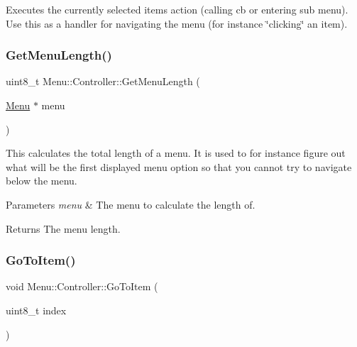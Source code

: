 Executes the currently selected items action (calling cb or entering sub menu). Use this as a handler for navigating the menu (for instance \char`\"{}clicking\char`\"{} an item). \hypertarget{class_menu_1_1_controller_a24009cee76b147079041b2130a806027}{}\label{class_menu_1_1_controller_a24009cee76b147079041b2130a806027} 
\subsubsection{\texorpdfstring{Get\+Menu\+Length()}{GetMenuLength()}}
{\footnotesize\ttfamily uint8\+\_\+t Menu\+::\+Controller\+::\+Get\+Menu\+Length (\begin{DoxyParamCaption}\item[{\hyperlink{struct_menu_1_1_menu}{Menu} $\ast$}]{menu }\end{DoxyParamCaption})\hspace{0.3cm}{\ttfamily [private]}}

This calculates the total length of a menu. It is used to for instance figure out what will be the first displayed menu option so that you cannot try to navigate below the menu. 
\begin{DoxyParams}{Parameters}
{\em menu} & The menu to calculate the length of. \\
\hline
\end{DoxyParams}
\begin{DoxyReturn}{Returns}
The menu length. 
\end{DoxyReturn}
\hypertarget{class_menu_1_1_controller_afa4a1e26efe90dd5d9479bb8c84404b6}{}\label{class_menu_1_1_controller_afa4a1e26efe90dd5d9479bb8c84404b6} 
\subsubsection{\texorpdfstring{Go\+To\+Item()}{GoToItem()}}
{\footnotesize\ttfamily void Menu\+::\+Controller\+::\+Go\+To\+Item (\begin{DoxyParamCaption}\item[{uint8\+\_\+t}]{index }\end{DoxyParamCaption})\hspace{0.3cm}{\ttfamily [private]}}

